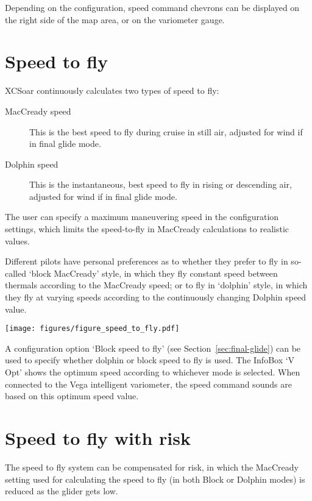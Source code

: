 Depending on the configuration, speed command chevrons can be
displayed on the right side of the map area, or on the variometer
gauge.


\section{Speed to fly}\label{sec:stf}

XCSoar continuously calculates two types of speed to fly:
\begin{description}
\item[MacCready speed]  This is the best speed to fly during cruise
  in still air, adjusted for wind if in final glide mode.
\item[Dolphin speed]  This is the instantaneous, best speed to fly
  in rising or descending air, adjusted for wind if in final glide
  mode.
\end{description}  

The user can specify a maximum maneuvering speed in the configuration
settings, which limits the speed-to-fly in MacCready calculations to
realistic values.

Different pilots have personal preferences as to whether they prefer
to fly in so-called `block MacCready' style, in which they fly
constant speed between thermals according to the MacCready speed; or
to fly in `dolphin' style, in which they fly at varying speeds
according to the continuously changing Dolphin speed value.

\begin{maxipage}
\begin{center}
\texttt{[image: figures/figure\_speed\_to\_fly.pdf]}
\end{center}
\end{maxipage}

A configuration option `Block speed to fly' (see
Section~\ref{sec:final-glide}) can be used to specify whether dolphin
or block speed to fly is used.  The InfoBox `V Opt' shows the optimum
speed according to whichever mode is selected.  When connected to the
Vega intelligent variometer, the speed command sounds are based on
this optimum speed value.


\section{Speed to fly with risk}\label{sec:safety-factor}

  The speed to fly system can be compensated for risk, in which the
  MacCready setting used for calculating the speed to fly (in both
  Block or Dolphin modes) is reduced as the glider gets low.

